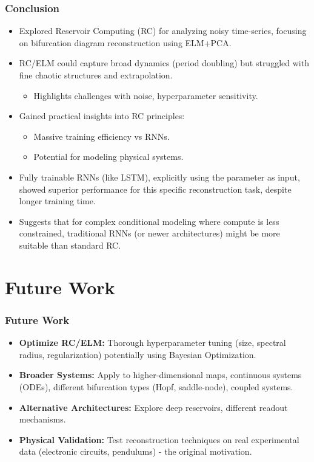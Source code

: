 \documentclass{beamer}
\begin{document}
\begin{frame}
    \frametitle{Conclusion}
    \begin{itemize}
        \item Explored Reservoir Computing (RC) for analyzing noisy time-series, focusing on bifurcation diagram reconstruction using ELM+PCA.
        \pause
        \item RC/ELM could capture broad dynamics (period doubling) but struggled with fine chaotic structures and extrapolation.
            \begin{itemize}
                \item Highlights challenges with noise, hyperparameter sensitivity.
            \end{itemize}
        \pause
        \item Gained practical insights into RC principles:
            \begin{itemize}
                \item Massive training efficiency vs RNNs.
                \item Potential for modeling physical systems.
            \end{itemize}
        \pause
        \item Fully trainable RNNs (like LSTM), explicitly using the parameter as input, showed superior performance for this specific reconstruction task, despite longer training time.
        \pause
        \item Suggests that for complex conditional modeling where compute is less constrained, traditional RNNs (or newer architectures) might be more suitable than standard RC.
    \end{itemize}
\end{frame}

\section{Future Work}

\begin{frame}
    \frametitle{Future Work}
    \begin{itemize}
        \item \textbf{Optimize RC/ELM:} Thorough hyperparameter tuning (size, spectral radius, regularization) potentially using Bayesian Optimization.
        \pause
        \item \textbf{Broader Systems:} Apply to higher-dimensional maps, continuous systems (ODEs), different bifurcation types (Hopf, saddle-node), coupled systems.
        \pause
        \item \textbf{Alternative Architectures:} Explore deep reservoirs, different readout mechanisms.
        \pause
        \item \textbf{Physical Validation:} Test reconstruction techniques on real experimental data (electronic circuits, pendulums) - the original motivation.
    \end{itemize}
\end{frame}
\end{document}
